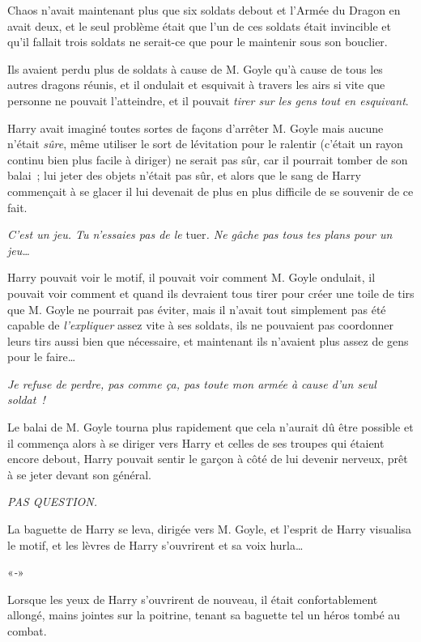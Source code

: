 Chaos n'avait maintenant plus que six soldats debout et l'Armée du Dragon en avait deux, et le seul problème était que l'un de ces soldats était invincible et qu'il fallait trois soldats ne serait-ce que pour le maintenir sous son bouclier.

Ils avaient perdu plus de soldats à cause de M. Goyle qu'à cause de tous les autres dragons réunis, et il ondulait et esquivait à travers les airs si vite que personne ne pouvait l'atteindre, et il pouvait \emph{tirer sur les gens tout en esquivant}.

Harry avait imaginé toutes sortes de façons d'arrêter M. Goyle mais aucune n'était \emph{sûre}, même utiliser le sort de lévitation pour le ralentir (c'était un rayon continu bien plus facile à diriger) ne serait pas sûr, car il pourrait tomber de son balai~; lui jeter des objets n'était pas sûr, et alors que le sang de Harry commençait à se glacer il lui devenait de plus en plus difficile de se souvenir de ce fait.

\emph{C'est un jeu. Tu n'essaies pas de le} tuer\emph{. Ne gâche pas tous tes plans pour un jeu…}

Harry pouvait voir le motif, il pouvait voir comment M. Goyle ondulait, il pouvait voir comment et quand ils devraient tous tirer pour créer une toile de tirs que M. Goyle ne pourrait pas éviter, mais il n'avait tout simplement pas été capable de \emph{l'expliquer} assez vite à ses soldats, ils ne pouvaient pas coordonner leurs tirs aussi bien que nécessaire, et maintenant ils n'avaient plus assez de gens pour le faire…

\emph{Je refuse de perdre, pas comme ça, pas toute mon armée à cause d'un seul soldat~!}

Le balai de M. Goyle tourna plus rapidement que cela n'aurait dû être possible et il commença alors à se diriger vers Harry et celles de ses troupes qui étaient encore debout, Harry pouvait sentir le garçon à côté de lui devenir nerveux, prêt à se jeter devant son général.

\emph{PAS QUESTION.}

La baguette de Harry se leva, dirigée vers M. Goyle, et l'esprit de Harry visualisa le motif, et les lèvres de Harry s'ouvrirent et sa voix hurla…

«\emph{-}»

\later

Lorsque les yeux de Harry s'ouvrirent de nouveau, il était confortablement allongé, mains jointes sur la poitrine, tenant sa baguette tel un héros tombé au combat.

